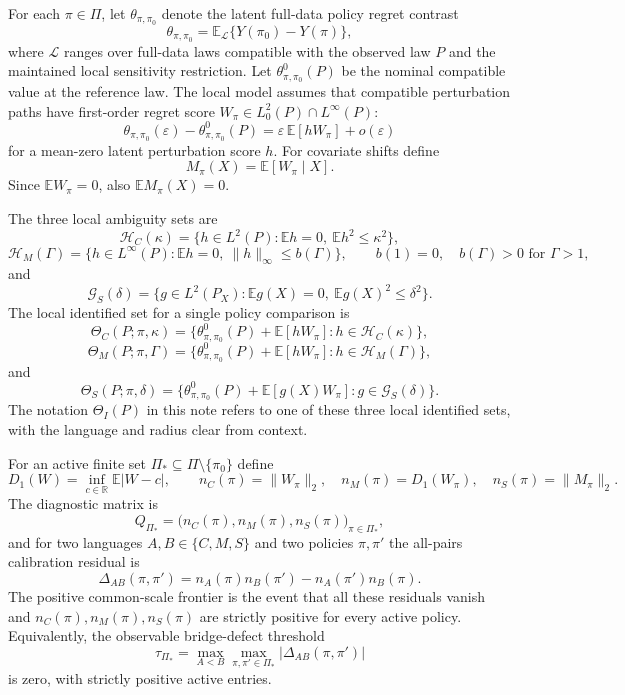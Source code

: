 \documentclass[11pt]{article}
\newcommand{\E}{\mathbb{E}}
\newcommand{\R}{\mathbb{R}}
\theoremstyle{definition}
\theoremstyle{plain}
\theoremstyle{remark}
\begin{document}
For each $\pi\in\Pi$, let $\theta_{\pi,\pi_0}$ denote the latent full-data policy
regret contrast
\[
  \theta_{\pi,\pi_0}=\E_{\mathcal L}\{Y(\pi_0)-Y(\pi)\},
\]
where $\mathcal L$ ranges over full-data laws compatible with the observed law
$P$ and the maintained local sensitivity restriction.  Let
$\theta^0_{\pi,\pi_0}(P)$ be the nominal compatible value at the reference law.
The local model assumes that compatible perturbation paths have first-order
regret score $W_\pi\in L^2_0(P)\cap L^\infty(P)$:
\[
  \theta_{\pi,\pi_0}(\varepsilon)-\theta^0_{\pi,\pi_0}(P)
  = \varepsilon\,\E[hW_\pi]+o(\varepsilon)
\]
for a mean-zero latent perturbation score $h$.  For covariate shifts define
\[
  M_\pi(X)=\E[W_\pi\mid X].
\]
Since $\E W_\pi=0$, also $\E M_\pi(X)=0$.

The three local ambiguity sets are
\[
  \mathcal H_C(\kappa)=\{h\in L^2(P):\E h=0,\ \E h^2\le \kappa^2\},
\]
\[
  \mathcal H_M(\Gamma)=\{h\in L^\infty(P):\E h=0,\ \|h\|_\infty\le b(\Gamma)\},
  \qquad b(1)=0,\quad b(\Gamma)>0\text{ for }\Gamma>1,
\]
and
\[
  \mathcal G_S(\delta)=\{g\in L^2(P_X):\E g(X)=0,\ \E g(X)^2\le \delta^2\}.
\]
The local identified set for a single policy comparison is
\[
  \Theta_C(P;\pi,\kappa)
  =\{\theta^0_{\pi,\pi_0}(P)+\E[hW_\pi]:h\in\mathcal H_C(\kappa)\},
\]
\[
  \Theta_M(P;\pi,\Gamma)
  =\{\theta^0_{\pi,\pi_0}(P)+\E[hW_\pi]:h\in\mathcal H_M(\Gamma)\},
\]
and
\[
  \Theta_S(P;\pi,\delta)
  =\{\theta^0_{\pi,\pi_0}(P)+\E[g(X)W_\pi]:g\in\mathcal G_S(\delta)\}.
\]
The notation $\Theta_I(P)$ in this note refers to one of these three local identified
sets, with the language and radius clear from context.

For an active finite set $\Pi_\ast\subseteq\Pi\setminus\{\pi_0\}$ define
\[
  D_1(W)=\inf_{c\in\R}\E|W-c|,
  \qquad
  n_C(\pi)=\|W_\pi\|_2,\quad
  n_M(\pi)=D_1(W_\pi),\quad
  n_S(\pi)=\|M_\pi\|_2.
\]
The diagnostic matrix is
\[
  Q_{\Pi_\ast}=\bigl(n_C(\pi),n_M(\pi),n_S(\pi)\bigr)_{\pi\in\Pi_\ast},
\]
and for two languages $A,B\in\{C,M,S\}$ and two policies $\pi,\pi'$ the all-pairs
calibration residual is
\[
  \Delta_{AB}(\pi,\pi')
  =n_A(\pi)n_B(\pi')-n_A(\pi')n_B(\pi).
\]
The positive common-scale frontier is the event that all these residuals vanish and
$n_C(\pi),n_M(\pi),n_S(\pi)$ are strictly positive for every active policy.
Equivalently, the observable bridge-defect threshold
\[
  \tau_{\Pi_\ast}
  =
  \max_{A<B}\max_{\pi,\pi'\in\Pi_\ast}|\Delta_{AB}(\pi,\pi')|
\]
is zero, with strictly positive active entries.
\end{document}

